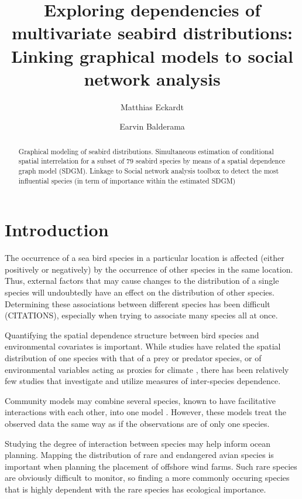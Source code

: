 \documentclass{statsoc}
\title[Graphical modeling of seabird distributions]{Exploring dependencies of multivariate seabird distributions: Linking graphical models to social network analysis}
\author[Author 1 {\it et al.}]{Matthias Eckardt}
\author{Earvin Balderama}
\begin{document}



\begin{abstract}
  Graphical modeling of seabird distributions. Simultaneous estimation of conditional spatial interrelation for a subset of $79$ seabird species by means of a spatial dependence graph model (SDGM). Linkage to Social network analysis toolbox to detect the most influential species (in term of importance within the estimated SDGM)  
\end{abstract}




\section{Introduction}

The occurrence of a sea bird species in a particular location is affected (either positively or negatively) by the occurrence of other species in the same location. 
Thus, external factors that may cause changes to the distribution of a single species will undoubtedly have an effect on the distribution of other species. Determining these associations between different species has been difficult (CITATIONS), especially when trying to associate many species all at once.

Quantifying the spatial dependence structure between bird species and environmental covariates is important. While studies have related the spatial distribution of one species with that of a prey or predator species, or of environmental variables acting as proxies for climate \citep{Goyert2014, Goyert2016}, there has been relatively few studies that investigate and utilize measures of inter-species dependence.

Community models may combine several species, known to have facilitative interactions with each other, into one model \citep{Goyert2016, Sollmann2016}. However, these models treat the observed data the same way as if the observations are of only one species.

Studying the degree of interaction between species may help inform ocean planning. Mapping the distribution of rare and endangered avian species is important when planning the placement of offshore wind farms. Such rare species are obviously difficult to monitor, so finding a more commonly occuring species that is highly dependent with the rare species has ecological importance.
\end{document}

